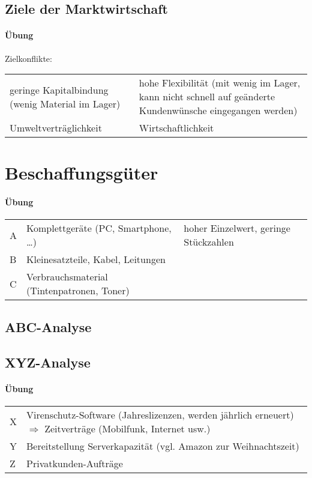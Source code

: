 \documentclass{scrreprt}
\begin{document}
\subsection{Ziele der Marktwirtschaft}
\paragraph{Übung} Zielkonflikte:\\
\begin{tabular}{L{0.5} L{0.5}}
geringe Kapitalbindung (wenig Material im Lager) & hohe Flexibilität (mit wenig im Lager, kann nicht schnell auf geänderte Kundenwünsche eingegangen werden)\tabularnewline
Umweltverträglichkeit & Wirtschaftlichkeit
\end{tabular}
\section{Beschaffungsgüter}
\paragraph{Übung} \parskp
\begin{tabular}{l l l }
A & Komplettgeräte (PC, Smartphone, …) & hoher Einzelwert, geringe Stückzahlen\\
B & Kleinesatzteile, Kabel, Leitungen \\
C & Verbrauchsmaterial (Tintenpatronen, Toner)
\end{tabular}
\subsection{ABC-Analyse}
\subsection{XYZ-Analyse}
\paragraph{Übung} \parskp
\begin{tabular}{L{0.1} L{0.9}}
X & Virenschutz-Software (Jahreslizenzen, werden jährlich erneuert) $\Rightarrow$ Zeitverträge (Mobilfunk, Internet usw.)\\
Y & Bereitstellung Serverkapazität (vgl. Amazon zur Weihnachtszeit)\\
Z & Privatkunden-Aufträge
\end{tabular}
\end{document}
